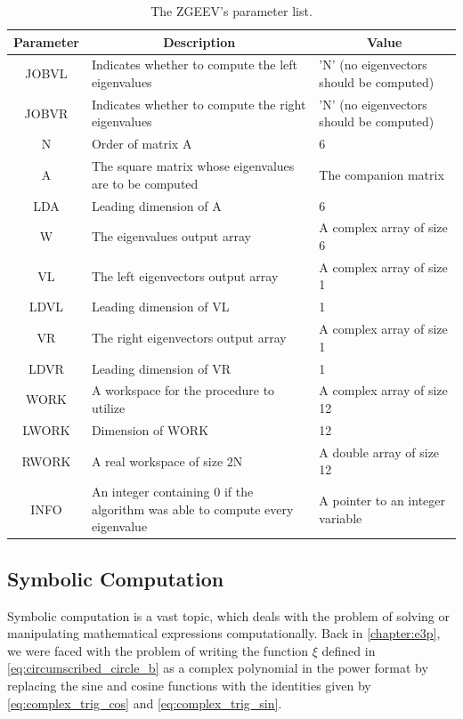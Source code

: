 \begin{table}[H]
	\begin{center}
	\begin{tabular}{|c|m{18em}|m{8em}|}
		
		\hline
		\textbf{Parameter} & \multicolumn{1}{c|}{\textbf{Description}} & \multicolumn{1}{c|}{\textbf{Value}}\\
		\hline
		JOBVL&  Indicates whether to compute the left eigenvalues&  'N' (no eigenvectors should be computed)\\
		\hline
		JOBVR&  Indicates whether to compute the right eigenvalues&  'N' (no eigenvectors should be computed)\\
		\hline
		N    &  Order of matrix A &  6\\
		\hline
		A    &  The square matrix whose eigenvalues are to be computed & The companion matrix \\
		\hline
		LDA  &  Leading dimension of A & 6 \\
		\hline
		W    &  The eigenvalues output array &  A complex array of size 6\\
		\hline
		VL   &  The left eigenvectors output array & A complex array of size 1 \\
		\hline
		LDVL &  Leading dimension of VL&  1\\
		\hline
		VR   &  The right eigenvectors output array&  A complex array of size 1\\
		\hline
		LDVR &  Leading dimension of VR&  1\\
		\hline
		WORK &  A workspace for the procedure to utilize&  A complex array of size 12\\
		\hline
		LWORK&  Dimension of WORK &  12\\
		\hline
		RWORK&  A real workspace of size 2N &  A double array of size 12\\
		\hline
		INFO &  An integer containing $0$ if the algorithm was able to compute every eigenvalue &  A pointer to an integer variable\\
		\hline
	\end{tabular}
	\end{center}
	\caption{The ZGEEV's parameter list.}
	\label{tab:zgeev}
\end{table}

\subsection{Symbolic Computation}

Symbolic computation is a vast topic, which deals with the problem of solving or manipulating mathematical expressions computationally. 
Back in \autoref{chapter:e3p}, we were faced with the problem of writing the function $\xi$ defined in \autoref{eq:circumscribed_circle_b} as a complex polynomial in the power format by replacing the sine and cosine functions with the identities given by  \autoref{eq:complex_trig_cos} and \autoref{eq:complex_trig_sin}.

